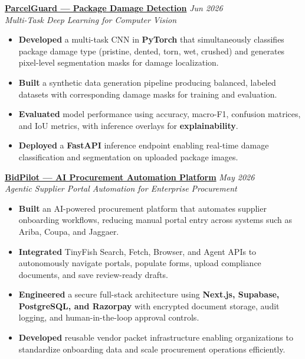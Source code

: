 \documentclass[a4paper,10pt]{article}
\begin{document}
\vspace{4pt}

\textbf{\href{https://github.com/let-the-dreamers-rise/parcelgaurd}{ParcelGuard --- Package Damage Detection}} \hfill \textit{Jun 2026} \\
\textit{Multi-Task Deep Learning for Computer Vision}
\begin{itemize}
    \item \textbf{Developed} a multi-task CNN in \textbf{PyTorch} that simultaneously classifies package damage type (pristine, dented, torn, wet, crushed) and generates pixel-level segmentation masks for damage localization.
    \item \textbf{Built} a synthetic data generation pipeline producing balanced, labeled datasets with corresponding damage masks for training and evaluation.
    \item \textbf{Evaluated} model performance using accuracy, macro-F1, confusion matrices, and IoU metrics, with inference overlays for \textbf{explainability}.
    \item \textbf{Deployed} a \textbf{FastAPI} inference endpoint enabling real-time damage classification and segmentation on uploaded package images.
\end{itemize}

\vspace{4pt}

\textbf{\href{https://github.com/let-the-dreamers-rise/tinyfish-bidpilot}{BidPilot --- AI Procurement Automation Platform}} \hfill \textit{May 2026} \\
\textit{Agentic Supplier Portal Automation for Enterprise Procurement}
\begin{itemize}
    \item \textbf{Built} an AI-powered procurement platform that automates supplier onboarding workflows, reducing manual portal entry across systems such as Ariba, Coupa, and Jaggaer.
    \item \textbf{Integrated} TinyFish Search, Fetch, Browser, and Agent APIs to autonomously navigate portals, populate forms, upload compliance documents, and save review-ready drafts.
    \item \textbf{Engineered} a secure full-stack architecture using \textbf{Next.js, Supabase, PostgreSQL, and Razorpay} with encrypted document storage, audit logging, and human-in-the-loop approval controls.
    \item \textbf{Developed} reusable vendor packet infrastructure enabling organizations to standardize onboarding data and scale procurement operations efficiently.
\end{itemize}
\end{document}

